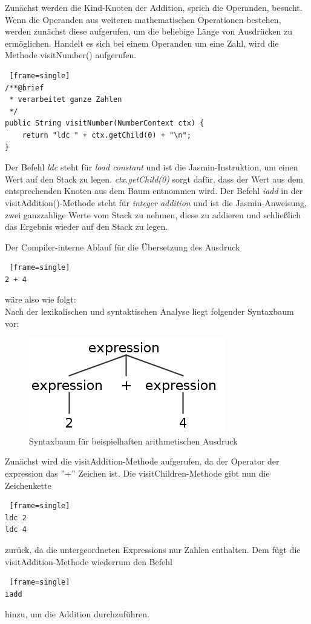 Zunächst werden die Kind-Knoten der Addition, sprich die Operanden, besucht. Wenn die Operanden aus weiteren mathematischen Operationen bestehen, werden zunächst diese aufgerufen, um die beliebige Länge von Ausdrücken zu ermöglichen. Handelt es sich bei einem Operanden um eine Zahl, wird die Methode visitNumber() aufgerufen.

\begin{lstlisting} [frame=single]
/**@brief
 * verarbeitet ganze Zahlen
 */
public String visitNumber(NumberContext ctx) {
	return "ldc " + ctx.getChild(0) + "\n";
}
\end{lstlisting}

Der Befehl \textit{ldc} steht für \textit{load constant} und ist die Jasmin-Instruktion, um einen Wert auf den Stack zu legen. \textit{ctx.getChild(0)} sorgt dafür, dass der Wert aus dem entsprechenden Knoten aus dem Baum entnommen wird.
Der Befehl \textit{iadd} in der visitAddition()-Methode steht für \textit{integer addition} und ist die Jasmin-Anweisung, zwei ganzzahlige Werte vom Stack zu nehmen, diese zu addieren und schließlich das Ergebnis wieder auf den Stack zu legen.

Der Compiler-interne Ablauf für die Übersetzung des Ausdruck 
\begin{lstlisting} [frame=single]
2 + 4
\end{lstlisting}
wäre also wie folgt: \\

Nach der lexikalischen und syntaktischen Analyse liegt folgender Syntaxbaum vor:

\begin{figure}[h!]
\centering
\includegraphics[scale=0.4]{pics/antlr4_parse_tree_visitAdditionVisitNumberBeispiel.png}
\caption{Syntaxbaum für beispielhaften arithmetischen Ausdruck}
\end{figure}
\pagebreak
Zunächst wird die visitAddition-Methode aufgerufen, da der Operator der expression das ''+'' Zeichen ist. Die visitChildren-Methode gibt nun die Zeichenkette
\begin{lstlisting} [frame=single]
ldc 2
ldc 4
\end{lstlisting}
zurück, da die untergeordneten Expressions nur Zahlen enthalten. Dem fügt die visitAddition-Methode wiederrum den Befehl
\begin{lstlisting} [frame=single]
iadd
\end{lstlisting}
hinzu, um die Addition durchzuführen.
\linebreak

